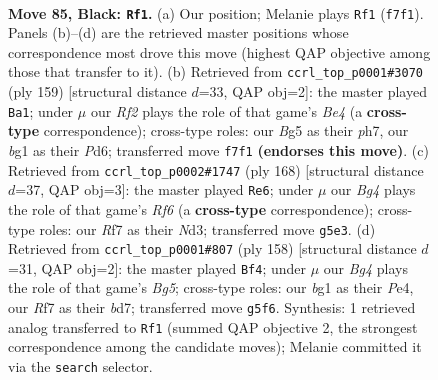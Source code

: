 \documentclass[11pt]{article}
\begin{document}
\clearpage

\begin{figure}[p]\centering
\begin{subfigure}{0.46\textwidth}\centering
\resizebox{\linewidth}{!}{%
\newchessgame
\chessboard[
  setfen={8/5r2/4k2p/3pp1b1/K6p/6n1/1R6/6B1 b - - 5 85},
  showmover=false,
  pgfstyle=straightmove, color=movearrow, markmove={f7-f1}
]}
\caption{}
\end{subfigure}\hfill
\begin{subfigure}{0.46\textwidth}\centering
\resizebox{\linewidth}{!}{%
\newchessgame
\chessboard[
  setfen={8/1R5P/3pk3/4b1p1/K1P2p2/8/P7/8 b - - 0 80},
  showmover=false,
  pgfstyle=straightmove, color=movearrow, markmove={e5-a1}
]}
\caption{}
\end{subfigure}
\\[4pt]
\begin{subfigure}{0.46\textwidth}\centering
\resizebox{\linewidth}{!}{%
\newchessgame
\chessboard[
  setfen={8/2k5/5R2/8/bPK5/P2N4/8/7r w - - 35 85},
  showmover=false,
  pgfstyle=straightmove, color=movearrow, markmove={f6-e6}
]}
\caption{}
\end{subfigure}\hfill
\begin{subfigure}{0.46\textwidth}\centering
\resizebox{\linewidth}{!}{%
\newchessgame
\chessboard[
  setfen={8/3b1k2/6p1/6B1/4P2P/4KP2/8/8 w - - 29 80},
  showmover=false,
  pgfstyle=straightmove, color=movearrow, markmove={g5-f4}
]}
\caption{}
\end{subfigure}
\caption{\textbf{Move 85, Black: \texttt{Rf1}.} (a) Our position; Melanie plays \texttt{Rf1} (\texttt{f7f1}). Panels (b)--(d) are the retrieved master positions whose correspondence most drove this move (highest QAP objective among those that transfer to it). (b) Retrieved from \texttt{ccrl\_top\_p0001\#3070} (ply 159) [structural distance $d$=33, QAP obj=2]: the master played \texttt{Ba1}; under $\mu$ our \emph{Rf2} plays the role of that game's \emph{Be4} (a \textbf{cross-type} correspondence); cross-type roles: our \emph{B}g5 as their \emph{p}h7, our \emph{b}g1 as their \emph{P}d6; transferred move \texttt{f7f1} \textbf{(endorses this move)}. (c) Retrieved from \texttt{ccrl\_top\_p0002\#1747} (ply 168) [structural distance $d$=37, QAP obj=3]: the master played \texttt{Re6}; under $\mu$ our \emph{Bg4} plays the role of that game's \emph{Rf6} (a \textbf{cross-type} correspondence); cross-type roles: our \emph{R}f7 as their \emph{N}d3; transferred move \texttt{g5e3}. (d) Retrieved from \texttt{ccrl\_top\_p0001\#807} (ply 158) [structural distance $d$=31, QAP obj=2]: the master played \texttt{Bf4}; under $\mu$ our \emph{Bg4} plays the role of that game's \emph{Bg5}; cross-type roles: our \emph{b}g1 as their \emph{P}e4, our \emph{R}f7 as their \emph{b}d7; transferred move \texttt{g5f6}. Synthesis: 1 retrieved analog transferred to \texttt{Rf1} (summed QAP objective 2, the strongest correspondence among the candidate moves); Melanie committed it via the \texttt{search} selector.}
\label{fig:thought-m169}
\end{figure}
\end{document}
